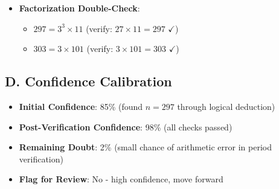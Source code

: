 \documentclass[11pt]{article}
\begin{document}
\begin{verificationbox}
\begin{itemize}[leftmargin=*]
    \item \textbf{Factorization Double-Check}:
    \begin{itemize}
        \item $297 = 3^3 \times 11$ (verify: $27 \times 11 = 297$ $\checkmark$)
        \item $303 = 3 \times 101$ (verify: $3 \times 101 = 303$ $\checkmark$)
    \end{itemize}
\end{itemize}

\subsection*{D. Confidence Calibration}
\begin{itemize}[leftmargin=*]
    \item \textbf{Initial Confidence}: 85\% (found $n=297$ through logical deduction)
    \item \textbf{Post-Verification Confidence}: 98\% (all checks passed)
    \item \textbf{Remaining Doubt}: 2\% (small chance of arithmetic error in period verification)
    \item \textbf{Flag for Review}: No - high confidence, move forward
\end{itemize}
\end{verificationbox}
\end{document}
